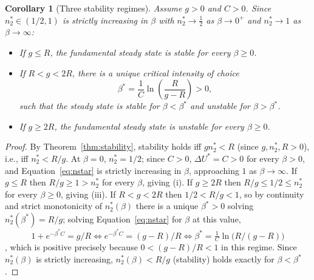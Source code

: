\documentclass[11pt]{article}
\newtheorem{corollary}{Corollary}
\theoremstyle{remark}
\theoremstyle{definition}
\begin{document}
\begin{corollary}[Three stability regimes]
\label{cor:regimes}
Assume $g>0$ and $C>0$. Since $n_2^{*}\in(1/2,1)$ is strictly increasing in $\beta$ with $n_2^{*}\to \tfrac12$ as $\beta\to0^{+}$ and $n_2^{*}\to1$ as $\beta\to\infty$:
\begin{itemize}
\item[(i)] If $g\le R$, the fundamental steady state is stable for every $\beta\ge0$.
\item[(ii)] If $R<g<2R$, there is a unique critical intensity of choice
\begin{equation}
\beta^{*} = \frac{1}{C}\ln\!\left(\frac{R}{g-R}\right) > 0,
\label{eq:betastar}
\end{equation}
such that the steady state is stable for $\beta<\beta^{*}$ and unstable for $\beta>\beta^{*}$.
\item[(iii)] If $g\ge2R$, the fundamental steady state is unstable for every $\beta\ge0$.
\end{itemize}
\end{corollary}
\begin{proof}
By Theorem~\ref{thm:stability}, stability holds iff $g n_2^{*}<R$ (since $g,n_2^{*},R>0$), i.e., iff $n_2^{*}<R/g$. At $\beta=0$, $n_2^{*}=1/2$; since $C>0$, $\Delta U^{*}=C>0$ for every $\beta>0$, and Equation~\eqref{eq:nstar} is strictly increasing in $\beta$, approaching $1$ as $\beta\to\infty$. If $g\le R$ then $R/g\ge1>n_2^{*}$ for every $\beta$, giving (i). If $g\ge 2R$ then $R/g\le1/2\le n_2^{*}$ for every $\beta\ge0$, giving (iii). If $R<g<2R$ then $1/2<R/g<1$, so by continuity and strict monotonicity of $n_2^{*}(\beta)$ there is a unique $\beta^{*}>0$ solving $n_2^{*}(\beta^{*})=R/g$; solving Equation~\eqref{eq:nstar} for $\beta$ at this value, 
\begin{equation*}
1+e^{-\beta^{*}C}=g/R \iff e^{-\beta^{*}C}=(g-R)/R \iff \beta^{*}=\tfrac1C\ln\big(R/(g-R)\big)
\end{equation*}
, which is positive precisely because $0<(g-R)/R<1$ in this regime. Since $n_2^{*}(\beta)$ is strictly increasing, $n_2^{*}(\beta)<R/g$ (stability) holds exactly for $\beta<\beta^{*}$.
\end{proof}
\end{document}
